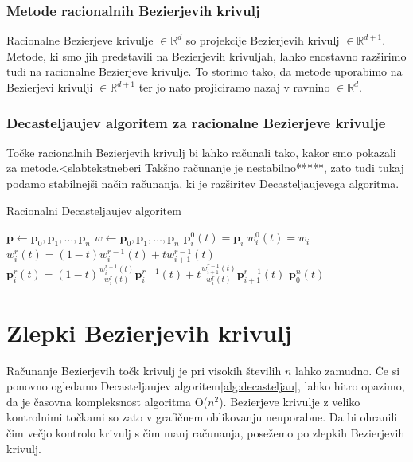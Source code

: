\documentclass[isrm2, tisk]{fmfdelo}
\newcommand{\R}{\mathbb R}
\newcommand{\p}{\textbf{p}}
\begin{document}
    \subsubsection{Metode racionalnih Bezierjevih krivulj}
    Racionalne Bezierjeve krivulje $\in\R^d$ so projekcije Bezierjevih krivulj $\in\R^{d+1}$.
    Metode, ki smo jih predstavili na Bezierjevih krivuljah, lahko enostavno razširimo tudi na racionalne Bezierjeve krivulje.
    To storimo tako, da metode uporabimo na Bezierjevi krivulji $\in\R^{d+1}$ ter jo nato projiciramo nazaj v ravnino $\in\R^{d}$.

    \subsubsection{Decasteljaujev algoritem za racionalne Bezierjeve krivulje}
    Točke racionalnih Bezierjevih krivulj bi lahko računali tako, kakor smo pokazali za metode.<slabtekstneberi
    Takšno računanje je nestabilno*****, zato tudi tukaj podamo stabilnejši način računanja, ki je razširitev Decasteljaujevega algoritma.

    \begin{algorithm}
        \caption{Racionalni Decasteljaujev algoritem}
        \begin{algorithmic}
            \State $\p \gets \p_0,\p_1,\dots,\p_n$
            \State $w\gets \p_0,\p_1,\dots,\p_n$
                \State $\p_i^0(t)=\p_i$
                \State $w_i^0(t)=w_i$
            \EndFor
                    \State $w_i^r(t)=(1-t)w_{i}^{r-1}(t)+tw_{i+1}^{r-1}(t)$
                    \State $\p_i^r(t)=(1-t)\frac{w_{i}^{r-1}(t)}{w_{i}^{r}(t)}\p_i^{r-1}(t)+t\frac{w_{i+1}^{r-1}(t)}{w_{i}^{r}(t)}\p_{i+1}^{r-1}(t)$
                \EndFor
            \EndFor
            \State \Return $\p_0^n(t)$
        \end{algorithmic}\label{alg:racionalni-decasteljau}
    \end{algorithm}


    \section{Zlepki Bezierjevih krivulj}
    Računanje Bezierjevih točk krivulj je pri visokih številih $n$ lahko zamudno.
    Če si ponovno ogledamo Decasteljaujev algoritem\ref{alg:decasteljau}, lahko hitro opazimo, da je časovna kompleksnost algoritma O($n^2$).
    Bezierjeve krivulje z veliko kontrolnimi točkami so zato v grafičnem oblikovanju neuporabne.
    Da bi ohranili čim večjo kontrolo krivulj s čim manj računanja, posežemo po zlepkih Bezierjevih krivulj.
\end{document}
